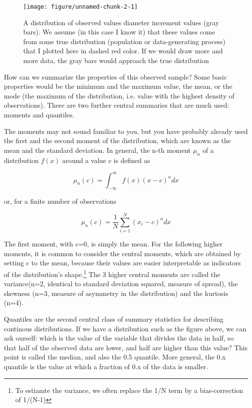 \documentclass[a4paper,twoside]{tufte-book}\usepackage[]{graphicx}\usepackage[]{color}
\makeatletter
\def\maxwidth{ %
  \ifdim\Gin@nat@width>\linewidth
    \linewidth
  \else
    \Gin@nat@width
  \fi
}
\makeatother
\begin{document}
{\begin{figure}[htbp]
\begin{center}
\begin{Schunk}
\texttt{[image: figure/unnamed-chunk-2-1]} \end{Schunk}
\caption{A distribution of observed values diameter increment values (gray bars). We assume (in this case I know it) that these values come from some true distribution (population or data-generating process) that I plotted here in dashed red color. If we would draw more and more data, the gray bars would approach the true distribution}
\label{fig: data distribution}
\end{center}
\end{figure}

How can we summarize the properties of this observed sample? Some basic properties would be the minimum and the maximum value, the mean, or the mode (the maximum of the distribution, i.e. value with the highest density of observations). There are two further central summaries that are much used: moments and quantiles.

The moments may not sound familiar to you, but you have probably already used the first and the second moment of the distribution, which are known as the mean and the standard deviation. In general, the n-th moment $\mu_n$ of a distribution $f(x)$ around a value c is defined as 

\begin{equation}
\mu_n(c) = \int_{-\infty}^{\infty} f(x) (x - c)^n dx
\end{equation}

or, for a finite number of observations 

\begin{equation}
\mu_n(c) = \frac{1}{N}\sum_{i=1}^N (x_i - c)^n dx
\end{equation}

The first moment, with c=0, is simply the mean. For the following higher moments, it is common to consider the central moments, which are obtained by setting c to the mean, because their values are easier interpretable as indicators of the distribution's shape.\footnote{To estiamte the variance, we often replace the 1/N term by a bias-correction of 1/(N-1)} The 3 higher central moments are called the variance(n=2, identical to standard deviation squared, measure of spread), the skewness (n=3, measure of asymmetry in the distribution) and the kurtosis (n=4). 

Quantiles are the second central class of summary statistics for describing continous distributions. If we have a distribution such as the figure above, we can ask ourself: which is the value of the variable that divides the data in half, so that half of the observed data are lower, and half are higher than this value? This point is called the median, and also the 0.5 quantile. More general, the 0.x quantile is the value at which a fraction of 0.x of the data is smaller. 

}
\end{document}
